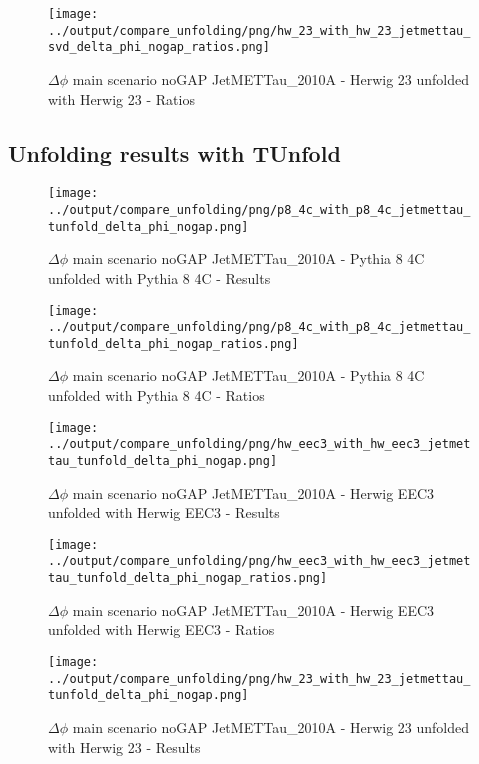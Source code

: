 \documentclass[11pt]{book}
\begin{document}
\begin{figure}[ht]
\centering
\texttt{[image: ../output/compare\_unfolding/png/hw\_23\_with\_hw\_23\_jetmettau\_svd\_delta\_phi\_nogap\_ratios.png]}
\caption{$\Delta\phi$ main scenario noGAP JetMETTau\_2010A - Herwig 23 unfolded with Herwig 23 - Ratios}
\label{hw_23_hw_23_jetmettau_svd_delta_phi_nogap_b}
\end{figure}


\clearpage
\subsection{Unfolding results with TUnfold}

\begin{figure}[ht]
\centering
\texttt{[image: ../output/compare\_unfolding/png/p8\_4c\_with\_p8\_4c\_jetmettau\_tunfold\_delta\_phi\_nogap.png]}
\caption{$\Delta\phi$ main scenario noGAP JetMETTau\_2010A - Pythia 8 4C unfolded with Pythia 8 4C - Results}
\label{p8_p8_jetmettau_tunfold_delta_phi_nogap_a}
\end{figure}

\begin{figure}[ht]
\centering
\texttt{[image: ../output/compare\_unfolding/png/p8\_4c\_with\_p8\_4c\_jetmettau\_tunfold\_delta\_phi\_nogap\_ratios.png]}
\caption{$\Delta\phi$ main scenario noGAP JetMETTau\_2010A - Pythia 8 4C unfolded with Pythia 8 4C - Ratios}
\label{p8_p8_jetmettau_tunfold_delta_phi_nogap_b}
\end{figure}

\begin{figure}[ht]
\centering
\texttt{[image: ../output/compare\_unfolding/png/hw\_eec3\_with\_hw\_eec3\_jetmettau\_tunfold\_delta\_phi\_nogap.png]}
\caption{$\Delta\phi$ main scenario noGAP JetMETTau\_2010A - Herwig EEC3 unfolded with Herwig EEC3 - Results}
\label{hw_eec3_hw_eec3_jetmettau_tunfold_delta_phi_nogap_a}
\end{figure}

\begin{figure}[ht]
\centering
\texttt{[image: ../output/compare\_unfolding/png/hw\_eec3\_with\_hw\_eec3\_jetmettau\_tunfold\_delta\_phi\_nogap\_ratios.png]}
\caption{$\Delta\phi$ main scenario noGAP JetMETTau\_2010A - Herwig EEC3 unfolded with Herwig EEC3 - Ratios}
\label{hw_eec3_hw_eec3_jetmettau_tunfold_delta_phi_nogap_b}
\end{figure}

\begin{figure}[ht]
\centering
\texttt{[image: ../output/compare\_unfolding/png/hw\_23\_with\_hw\_23\_jetmettau\_tunfold\_delta\_phi\_nogap.png]}
\caption{$\Delta\phi$ main scenario noGAP JetMETTau\_2010A - Herwig 23 unfolded with Herwig 23 - Results}
\label{hw_23_hw_23_jetmettau_tunfold_delta_phi_nogap_a}
\end{figure}
\end{document}
